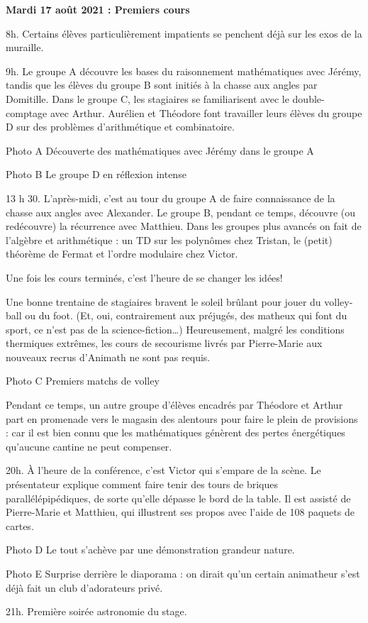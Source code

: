 \begin{center}
{\textbf{Mardi 17 août 2021 : Premiers cours}}
\end{center}
\vspace{2mm}

8h. Certains élèves particulièrement impatients se penchent déjà sur les exos de la muraille.

9h. Le groupe A découvre les bases du raisonnement mathématiques avec Jérémy, tandis que les élèves du groupe B sont initiés à la chasse aux angles par Domitille. Dans le groupe C, les stagiaires se familiarisent avec le double-comptage avec Arthur. Aurélien et Théodore font travailler leurs élèves du groupe D sur des problèmes d’arithmétique et combinatoire.

Photo A
Découverte des mathématiques avec Jérémy dans le groupe A

Photo B
Le groupe D en réflexion intense

13 h 30. L’après-midi, c’est au tour du groupe A de faire connaissance de la chasse aux angles avec Alexander. Le groupe B, pendant ce temps, découvre (ou redécouvre) la récurrence avec Matthieu. Dans les groupes plus avancés on fait de l’algèbre et arithmétique : un TD sur les polynômes chez Tristan, le (petit) théorème de Fermat et l’ordre modulaire chez Victor.

Une fois les cours terminés, c’est l’heure de se changer les idées!

Une bonne trentaine de stagiaires bravent le soleil brûlant pour jouer du volley-ball ou du foot. (Et, oui, contrairement aux préjugés, des matheux qui font du sport, ce n’est pas de la science-fiction…) Heureusement, malgré les conditions thermiques extrêmes, les cours de secourisme livrés par Pierre-Marie aux nouveaux recrus d’Animath ne sont pas requis.

Photo C
Premiers matchs de volley

Pendant ce temps, un autre groupe d’élèves encadrés par Théodore et Arthur part en promenade vers le magasin des alentours pour faire le plein de provisions : car il est bien connu que les mathématiques génèrent des pertes énergétiques qu’aucune cantine ne peut compenser.

20h. À l’heure de la conférence, c’est Victor qui s’empare de la scène. Le présentateur explique comment faire tenir des tours de briques parallélépipédiques, de sorte qu’elle dépasse le bord de la table. Il est assisté de Pierre-Marie et Matthieu, qui illustrent ses propos avec l’aide de 108 paquets de cartes.

Photo D
Le tout s’achève par une démonstration grandeur nature.

Photo E
Surprise derrière le diaporama : on dirait qu’un certain animatheur s’est déjà fait un club d’adorateurs privé.

21h. Première soirée astronomie du stage.